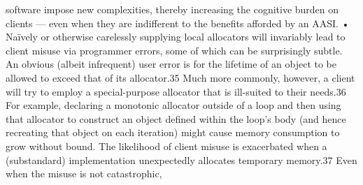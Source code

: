 software impose new complexities, thereby increasing the cognitive burden on
clients — even when they are indifferent to the benefits afforded by an AASI.
• Naïvely or otherwise carelessly supplying local allocators will invariably lead to
client misuse via programmer errors, some of which can be surprisingly
subtle. An obvious (albeit infrequent) user error is for the lifetime of an object
to be allowed to exceed that of its allocator.35 Much more commonly, however,
a client will try to employ a special-purpose allocator that is ill-suited to their
needs.36 For example, declaring a monotonic allocator outside of a loop and
then using that allocator to construct an object defined within the loop’s body
(and hence recreating that object on each iteration) might cause memory
consumption to grow without bound. The likelihood of client misuse is
exacerbated when a (substandard) implementation unexpectedly allocates
temporary memory.37 Even when the misuse is not catastrophic,

